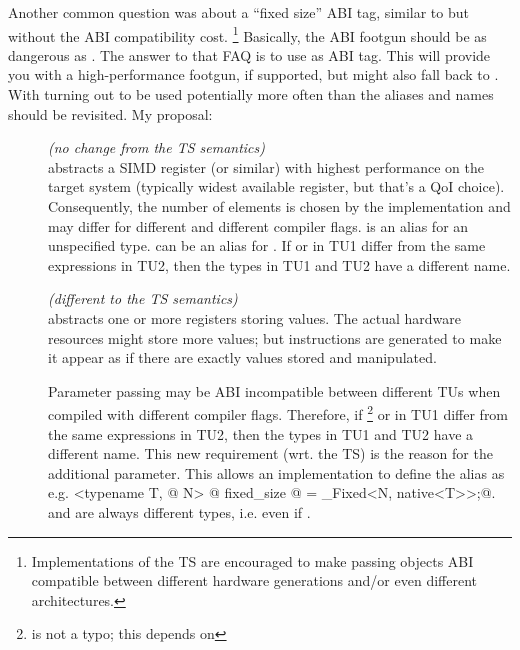 Another common question was about a “fixed size” ABI tag, similar to \stdx\simdabi{} but without the ABI compatibility cost.%
\footnote{Implementations of the TS are encouraged to make passing  objects ABI compatible between different hardware generations and/or even different architectures.}
Basically, the ABI footgun should be as dangerous as \stdx\simdabi{}.
The answer to that FAQ is to use \stdx\simdabi{} as ABI tag.
This will provide you with a high-performance footgun, if supported, but might also fall back to \stdx\simdabi{}.
With \stdx\simdabi{} turning out to be used potentially more often than \stdx\simdabi{} the aliases and names should be revisited.
My proposal:

\begin{description}
  \item[] \emph{(no change from the TS semantics)}\\
     abstracts a SIMD register (or similar) with highest performance on the target system (typically widest available register, but that's a QoI choice).
    Consequently, the number of elements is chosen by the implementation and may differ for different  and different compiler flags.
    \simdabi{} is an alias for an unspecified type.
    \simdabi{} can be an alias for \simdabi{}.
    If  or  in TU1 differ from the same expressions in TU2, then the types  in TU1 and TU2 have a different name.

  \item[] \emph{(different to the TS semantics)}\\
     abstracts one or more registers storing  values.
    The actual hardware resources might store more values; but instructions are generated to make it appear as if there are exactly  values stored and manipulated.

    Parameter passing may be ABI incompatible between different TUs when compiled with different compiler flags.
    Therefore, if %
    \footnote{ is not a typo; this depends on \simdabi{}}
    or  in TU1
    differ from the same expressions in TU2, then the types  in TU1
    and TU2 have a different name.
    This new requirement (wrt. the TS) is the reason for the additional
     parameter.
    This allows an implementation to define the  alias as e.g.
    \lstinline@template <typename T, @
    \lstinline@int N> @
    \lstinline@using fixed_size @
    \lstinline@= _Fixed<N, native<T>>;@.
     and  are always different types, i.e. even if .


\end{description}
